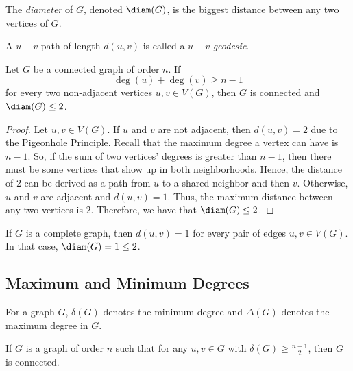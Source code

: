 \begin{definition}[Diameter]
  The \textit{diameter} of \(G\), denoted \(\diam(G)\), is the biggest distance
  between any two vertices of \(G\).
\end{definition}

\begin{definition}[Geodesic]
  A \(u - v\) path of length \(d(u, v)\) is called a \(u - v\)
  \textit{geodesic}.
\end{definition}

\begin{theorem}\label{thm:graph-diameter}
  Let \(G\) be a connected graph of order \(n\). If 
  \[ \deg(u) + \deg(v) \geq n-1 \]
  for every two non-adjacent vertices \(u, v \in V(G)\), then \(G\) is connected
  and \(\diam(G) \leq 2\).
\end{theorem}

\begin{proof}
  Let \(u, v \in V(G)\). If \(u\) and \(v\) are not adjacent, then \(d(u, v) = 2\) due to the
  Pigeonhole Principle. Recall that the maximum degree a vertex can have is
  \(n-1\). So, if the sum of two vertices' degrees is greater than \(n-1\), then
  there must be some vertices that show up in both neighborhoods. Hence, the
  distance of 2 can be derived as a path from \(u\) to a shared neighbor and
  then \(v\). Otherwise, \(u\) and \(v\) are adjacent and \(d(u, v) = 1\). Thus,
  the maximum distance between any two vertices is 2. Therefore, we have that 
  \(\diam(G) \leq 2\).
\end{proof}

\begin{remark}
  If \(G\) is a complete graph, then \(d(u, v) = 1\) for every pair of edges
  \(u, v \in V(G)\). In that case, \(\diam(G) = 1 \leq 2\).
\end{remark}

\subsection{Maximum and Minimum Degrees}

\begin{definition}
  For a graph \(G\), \(\delta(G)\) denotes the minimum degree and
  \(\Delta(G)\) denotes the maximum degree in \(G\).
\end{definition}

\begin{corollary}
  If \(G\) is a graph of order \(n\) such that for any \(u, v \in G\) with
  \(\delta(G) \geq \frac{n-1}{2}\), then \(G\) is connected.
\end{corollary}

